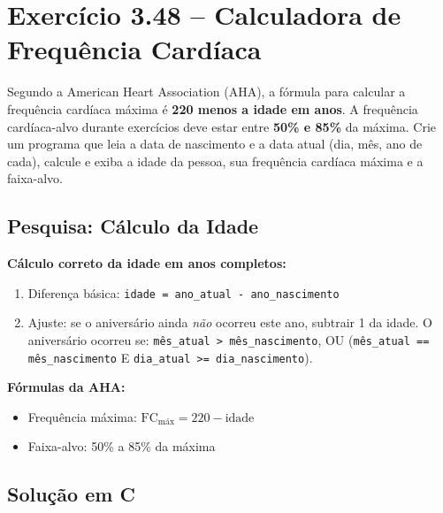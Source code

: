 \documentclass[12pt,a4paper]{article}
\begin{document}
\newpage

\section{Exercício 3.48 -- Calculadora de Frequência Cardíaca}

\begin{enunciadoBox}[Enunciado 3.48]
Segundo a American Heart Association (AHA), a fórmula para calcular a frequência
cardíaca máxima é \textbf{220 menos a idade em anos}. A frequência cardíaca-alvo
durante exercícios deve estar entre \textbf{50\% e 85\%} da máxima.
Crie um programa que leia a data de nascimento e a data atual (dia, mês, ano de cada),
calcule e exiba a idade da pessoa, sua frequência cardíaca máxima e a faixa-alvo.
\end{enunciadoBox}

\subsection*{Pesquisa: Cálculo da Idade}

\begin{pesquisa}
\textbf{Cálculo correto da idade em anos completos:}
\begin{enumerate}[noitemsep]
  \item Diferença básica: \texttt{idade = ano\_atual - ano\_nascimento}
  \item Ajuste: se o aniversário ainda \textit{não} ocorreu este ano, subtrair 1
  da idade. O aniversário ocorreu se: \texttt{mês\_atual > mês\_nascimento}, OU
  (\texttt{mês\_atual == mês\_nascimento} E \texttt{dia\_atual >= dia\_nascimento}).
\end{enumerate}

\textbf{Fórmulas da AHA:}
\begin{itemize}[noitemsep]
  \item Frequência máxima: \(\text{FC}_\text{máx} = 220 - \text{idade}\)
  \item Faixa-alvo: 50\% a 85\% da máxima
\end{itemize}
\end{pesquisa}

\subsection*{Solução em C}
\end{document}
